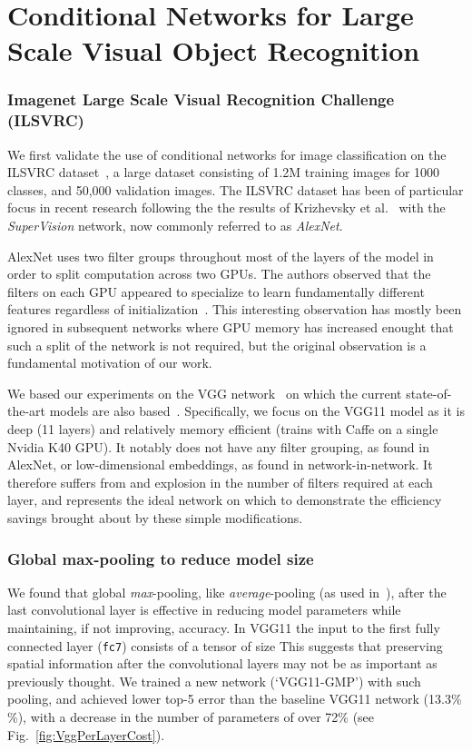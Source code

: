 \documentclass[thesis]{subfiles}
\begin{document}
\chapter{Conditional Networks for Large Scale Visual Object Recognition}
\label{firstyear}

\subsection{Imagenet Large Scale Visual Recognition Challenge (ILSVRC)}
We first validate the use of conditional networks for image classification on the ILSVRC dataset~\cite{ILSVRC2015}, a large dataset consisting of 1.2M training images for 1000 classes, and 50,000 validation images. The ILSVRC dataset has been of particular focus in recent research following the the results of Krizhevsky et al.~\cite{Krizhevsky2012imanet} with the \emph{SuperVision} network, now commonly referred to as \emph{AlexNet}.

AlexNet uses two filter groups throughout most of the layers of the model in order to split computation across two GPUs. The authors observed that the filters on each GPU appeared to specialize to learn fundamentally different features regardless of initialization~\cite{Krizhevsky2012imanet}. This interesting observation has mostly been ignored in subsequent networks where GPU memory has increased enought that such a split of the network is not required, but the original observation is a fundamental motivation of our work.

We based our experiments on the VGG network~\cite{Simonyan2014verydeep} on which the current state-of-the-art models are also based~\cite{He2015delving}. Specifically, we focus on the VGG11 model as it is deep (11 layers) and relatively memory efficient (trains with Caffe on a single Nvidia K40 GPU). It notably does not have any filter grouping, as found in AlexNet, or low-dimensional embeddings, as found in network-in-network. It therefore suffers from and explosion in the number of filters required at each layer, and represents the ideal network on which to demonstrate the efficiency savings brought about by these simple modifications.

\subsection{Global max-pooling to reduce model size}
We found that global {\em max}-pooling, like 
{\em average}-pooling (as used in~\cite{Lin2013NiN,Szegedy2014going}), after the last convolutional layer is effective in reducing model parameters while maintaining, if not improving, accuracy. In VGG11 the input to the first fully connected layer (\ie \texttt{fc7}) consists of a tensor of size 
This suggests that preserving spatial information after the convolutional layers may not be as important as previously thought. 
We trained a new network (`VGG11-GMP') with such pooling, and achieved lower top-5 error than the baseline VGG11 
network (13.3\% \%), with a decrease in the number of parameters of over 72\% (see Fig.~\ref{fig:VggPerLayerCost}).
\end{document}
